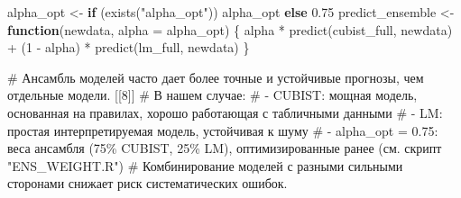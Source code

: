 \documentclass[
  letterpaper,
  DIV=11,
  numbers=noendperiod]{scrreprt}
\newenvironment{Shaded}{\begin{snugshade}}{\end{snugshade}}
\newcommand{\AttributeTok}[1]{\textcolor[rgb]{0.40,0.45,0.13}{#1}}
\newcommand{\CommentTok}[1]{\textcolor[rgb]{0.37,0.37,0.37}{#1}}
\newcommand{\ControlFlowTok}[1]{\textcolor[rgb]{0.00,0.23,0.31}{\textbf{#1}}}
\newcommand{\DecValTok}[1]{\textcolor[rgb]{0.68,0.00,0.00}{#1}}
\newcommand{\FloatTok}[1]{\textcolor[rgb]{0.68,0.00,0.00}{#1}}
\newcommand{\FunctionTok}[1]{\textcolor[rgb]{0.28,0.35,0.67}{#1}}
\newcommand{\NormalTok}[1]{\textcolor[rgb]{0.00,0.23,0.31}{#1}}
\newcommand{\OtherTok}[1]{\textcolor[rgb]{0.00,0.23,0.31}{#1}}
\newcommand{\SpecialCharTok}[1]{\textcolor[rgb]{0.37,0.37,0.37}{#1}}
\newcommand{\StringTok}[1]{\textcolor[rgb]{0.13,0.47,0.30}{#1}}
\begin{document}
\begin{Shaded}
\begin{Highlighting}[]
\NormalTok{alpha\_opt }\OtherTok{\textless{}{-}} \ControlFlowTok{if}\NormalTok{ (}\FunctionTok{exists}\NormalTok{(}\StringTok{"alpha\_opt"}\NormalTok{)) alpha\_opt }\ControlFlowTok{else} \FloatTok{0.75}
\NormalTok{predict\_ensemble }\OtherTok{\textless{}{-}} \ControlFlowTok{function}\NormalTok{(newdata, }\AttributeTok{alpha =}\NormalTok{ alpha\_opt) \{}
\NormalTok{  alpha }\SpecialCharTok{*} \FunctionTok{predict}\NormalTok{(cubist\_full, newdata) }\SpecialCharTok{+}\NormalTok{ (}\DecValTok{1} \SpecialCharTok{{-}}\NormalTok{ alpha) }\SpecialCharTok{*} \FunctionTok{predict}\NormalTok{(lm\_full, newdata)}
\NormalTok{\}}

\CommentTok{\# Ансамбль моделей часто дает более точные и устойчивые прогнозы, чем отдельные модели. [[8]]}
\CommentTok{\# В нашем случае:}
\CommentTok{\#   {-} CUBIST: мощная модель, основанная на правилах, хорошо работающая с табличными данными}
\CommentTok{\#   {-} LM: простая интерпретируемая модель, устойчивая к шуму}
\CommentTok{\#   {-} alpha\_opt = 0.75: веса ансамбля (75\% CUBIST, 25\% LM), оптимизированные ранее (см. скрипт "ENS\_WEIGHT.R")}
\CommentTok{\# Комбинирование моделей с разными сильными сторонами снижает риск систематических ошибок.}


\end{Highlighting}
\end{Shaded}
\end{document}
